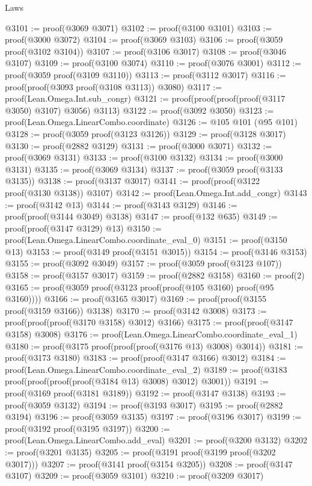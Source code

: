 \begin{lexlean}{Laws}
\begin{coremodule}
@3101 := proof(@3069 @3071)
@3102 := proof(@3100 @3101)
@3103 := proof(@3000 @3072)
@3104 := proof(@3069 @3103)
@3106 := proof(@3059 proof(@3102 @3104))
@3107 := proof(@3106 @3017)
@3108 := proof(@3046 @3107)
@3109 := proof(@3100 @3074)
@3110 := proof(@3076 @3001)
@3112 := proof(@3059 proof(@3109 @3110))
@3113 := proof(@3112 @3017)
@3116 := proof(proof(@3093 proof(@3108 @3113)) @3080)
@3117 := proof(Lean.Omega.Int.sub_congr)
@3121 := proof(proof(proof(proof(@3117 @3050) @3107) @3056) @3113)
@3122 := proof(@3092 @3050)
@3123 := proof(Lean.Omega.LinearCombo.coordinate)
@3126 := @105 @101 (@95 @101)
@3128 := proof(@3059 proof(@3123 @3126))
@3129 := proof(@3128 @3017)
@3130 := proof(@2882 @3129)
@3131 := proof(@3000 @3071)
@3132 := proof(@3069 @3131)
@3133 := proof(@3100 @3132)
@3134 := proof(@3000 @3131)
@3135 := proof(@3069 @3134)
@3137 := proof(@3059 proof(@3133 @3135))
@3138 := proof(@3137 @3017)
@3141 := proof(proof(@3122 proof(@3130 @3138)) @3107)
@3142 := proof(Lean.Omega.Int.add_congr)
@3143 := proof(@3142 @13)
@3144 := proof(@3143 @3129)
@3146 := proof(proof(@3144 @3049) @3138)
@3147 := proof(@132 @635)
@3149 := proof(proof(@3147 @3129) @13)
@3150 := proof(Lean.Omega.LinearCombo.coordinate_eval_0)
@3151 := proof(@3150 @13)
@3153 := proof(@3149 proof(@3151 @3015))
@3154 := proof(@3146 @3153)
@3155 := proof(@3092 @3049)
@3157 := proof(@3059 proof(@3123 @107))
@3158 := proof(@3157 @3017)
@3159 := proof(@2882 @3158)
@3160 := proof(2)
@3165 := proof(@3059 proof(@3123 proof(proof(@105 @3160) proof(@95 @3160))))
@3166 := proof(@3165 @3017)
@3169 := proof(proof(@3155 proof(@3159 @3166)) @3138)
@3170 := proof(@3142 @3008)
@3173 := proof(proof(proof(@3170 @3158) @3012) @3166)
@3175 := proof(proof(@3147 @3158) @3008)
@3176 := proof(Lean.Omega.LinearCombo.coordinate_eval_1)
@3180 := proof(@3175 proof(proof(proof(@3176 @13) @3008) @3014))
@3181 := proof(@3173 @3180)
@3183 := proof(proof(@3147 @3166) @3012)
@3184 := proof(Lean.Omega.LinearCombo.coordinate_eval_2)
@3189 := proof(@3183 proof(proof(proof(proof(@3184 @13) @3008) @3012) @3001))
@3191 := proof(@3169 proof(@3181 @3189))
@3192 := proof(@3147 @3138)
@3193 := proof(@3059 @3132)
@3194 := proof(@3193 @3017)
@3195 := proof(@2882 @3194)
@3196 := proof(@3059 @3135)
@3197 := proof(@3196 @3017)
@3199 := proof(@3192 proof(@3195 @3197))
@3200 := proof(Lean.Omega.LinearCombo.add_eval)
@3201 := proof(@3200 @3132)
@3202 := proof(@3201 @3135)
@3205 := proof(@3191 proof(@3199 proof(@3202 @3017)))
@3207 := proof(@3141 proof(@3154 @3205))
@3208 := proof(@3147 @3107)
@3209 := proof(@3059 @3101)
@3210 := proof(@3209 @3017)

\end{coremodule}
\end{lexlean}
